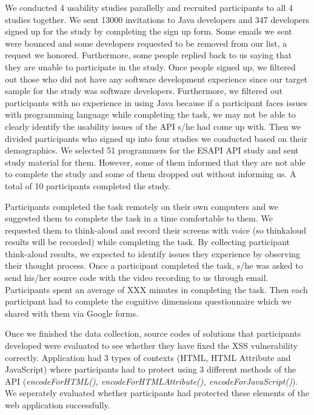 \documentclass[10pt]{article}
\begin{document}
We conducted 4 usability studies parallelly and recruited
participants to all 4 studies together. We sent 13000 invitations
to Java developers and 347 developers signed up for the
study by completing the sign up form. Some emails we sent
were bounced and some developers requested to be removed
from our list, a request we honored. Furthermore, some people replied back to us saying that they are unable to
participate in the study. Once people signed up, we filtered
out those who did not have any software development experience
since our target sample for the study was software
developers. Furthermore, we filtered out participants with
no experience in using Java because if a participant faces issues
with programming language while completing the task,
we may not be able to clearly identify the usability issues of
the API s/he had come up with. Then we divided participants
who signed up into four studies we conducted based
on their demographics. We selected 51 programmers for the
ESAPI API study and sent study material for them. However, some of them informed that they are not able to complete the study and some of them dropped out without informing us. A total of 10 participants completed the study. 

Participants completed the task remotely on their own computers and we suggested them to complete the task in a time comfortable to them. We requested them to think-aloud \cite{thinkaloud} and record their screens with voice (so thinkaloud results will be recorded) while completing the task. By collecting participant think-aloud results, we expected to identify issues they experience by observing their thought process. Once a participant completed the task, s/he was asked to send his/her source code with the video recording to us through email. Participants spent an average of XXX minutes in completing the task. Then each participant had to complete the cognitive dimensions questionnaire \cite{wijaya} which we shared with them via Google forms.

Once we finished the data collection, source codes of solutions that participants developed were evaluated to see whether they have fixed the XSS vulnerability correctly. Application had 3 types of contexts (HTML, HTML Attribute and JavaScript) where participants had to protect using 3 different methods of the API (\textit{encodeForHTML(), encodeForHTMLAttribute(), encodeForJavaScript()}). We seperately evaluated whether participants had protected these elements of the web application successfully.
\end{document}
